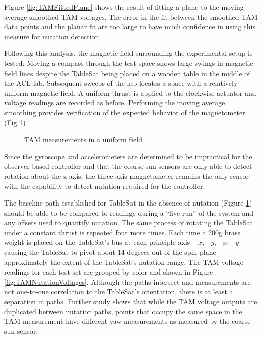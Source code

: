 Figure \ref{fig:TAMFittedPlane} shows the result of fitting a plane to the moving average smoothed TAM voltages.  The error in the fit between the smoothed TAM data points and the planar fit are too large to have much confidence in using this measure for nutation detection.

Following this analysis, the magnetic field surrounding the experimental setup is tested.  Moving a compass through the test space shows large swings in magnetic field lines despite the TableSat being placed on a wooden table in the middle of the ACL lab.  Subsequent sweeps of the lab locates a space with a relatively uniform magnetic field.  A uniform thrust is applied to the clockwise actuator and voltage readings are recorded as before.  Performing the moving average smoothing provides verification of the expected behavior of the magnetometer (Fig \ref{fig:TAMUniformField})

\begin{figure}[H]
  \centerline{}
  \caption{TAM measurements in a uniform field}
  \label{fig:TAMUniformField}
\end{figure}

Since the gyroscope and accelerometers are determined to be impractical for the observer-based controller and that the coarse sun sensors are only able to detect rotation about the z-axis, the three-axis magnetometer remains the only sensor with the capability to detect nutation required for the controller.

The baseline path established for TableSat in the absence of nutation (Figure \ref{fig:TAMUniformField}) should be able to be compared to readings during a ``live run'' of the system and any offsets used to quantify nutation.  The same process of rotating the TableSat under a constant thrust is repeated four more times.  Each time a 200g brass weight is placed on the TableSat's bus at each principle axis $+x, +y, -x, -y$ causing the TableSat to pivot about 14 degrees out of the spin plane approximately the extent of the TableSat's nutation range.  The TAM voltage readings for each test set are grouped by color and shown in Figure \ref{fig:TAMNutationVoltages}.  Although the paths intersect and measurements are not one-to-one correlation to the TableSat's orientation, there is at least a separation in paths.  Further study shows that while the TAM voltage outputs are duplicated between nutation paths, points that occupy the same space in the TAM measurement have different yaw measurements as measured by the coarse sun sensor.

